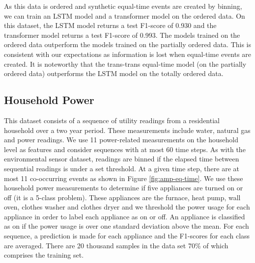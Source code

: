 \documentclass[reqno ,11pt]{article}
\begin{document}
\begin{table}[h]
\begin{center}
\caption{Environmental Sensor Performance Metrics (F1 score)}

\label{tab:AoT-metrics}
\end{center}
\end{table}

As this data is ordered and synthetic equal-time events are created by binning, we can train an LSTM model and a transformer model on the ordered data. On this dataset, the LSTM model returns a test F1-score of 0.930 and the transformer model returns a test F1-score of 0.993. The models trained on the ordered data outperform the models trained on the partially ordered data. This is consistent with our expectations as information is lost when equal-time events are created. It is noteworthy that the trans-trans equal-time model (on the partially ordered data) outperforms the LSTM model on the totally ordered data.

\subsection{Household Power} This dataset consists of a sequence of utility readings from a residential household over a two year period. These measurements include water, natural gas and power readings. We use 11 power-related measurements on the household level as features and consider sequences with at most 60 time steps. As with the environmental sensor dataset, readings are binned if the elapsed time between sequential readings is under a set threshold. At a given time step, there are at most 11 co-occurring events as shown in Figure \ref{fig:amp-eq-time}. We use these household power measurements to determine if five appliances are turned on or off (it is a 5-class problem). These appliances are the furnace, heat pump, wall oven, clothes washer and clothes dryer and we threshold the power usage for each appliance in order to label each appliance as on or off. An appliance is classified as on if the power usage is over one standard deviation above the mean. For each sequence, a prediction is made for each appliance and the F1-scores for each class are averaged. There are 20 thousand samples in the data set 70\% of which comprises the training set. 
\end{document}
